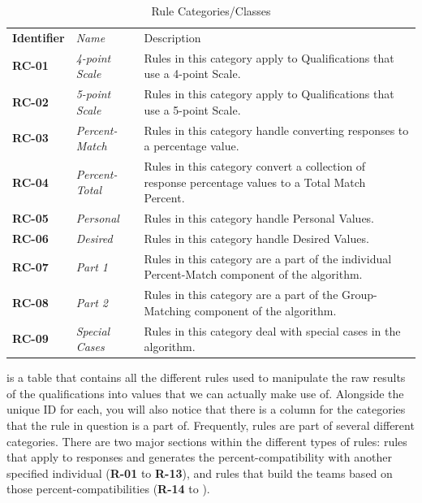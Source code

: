 \documentclass[12pt,letterpaper]{article}
\begin{document}
\begin{table}[H]
	\caption{Rule Categories/Classes}
	\begin{tabu} to 
	    \tableheader{}Identifier & Name & Description\\
		RC-01 & 4-point Scale & Rules in this category apply to Qualifications that use a 4-point Scale.\\
		RC-02 & 5-point Scale & Rules in this category apply to Qualifications that use a 5-point Scale.\\
		RC-03 & Percent-Match & Rules in this category handle converting responses to a percentage value.\\
		RC-04 & Percent-Total & Rules in this category convert a collection of response percentage values to a Total Match Percent.\\
		RC-05 & Personal & Rules in this category handle Personal Values. \\
		RC-06 & Desired & Rules in this category handle Desired Values.\\
		RC-07 & Part 1 & Rules in this category are a part of the individual Percent-Match component of the algorithm.\\
		RC-08 & Part 2 & Rules in this category are a part of the Group-Matching component of the algorithm.\\
		RC-09 & Special Cases & Rules in this category deal with special cases in the algorithm.\\
	\end{tabu}
\end{table}

 is a table that contains all the different rules used to manipulate the raw results of the qualifications into values that we can actually make use of. Alongside the unique ID for each, you will also notice that there is a column for the categories that the rule in question is a part of. Frequently, rules are part of several different categories. There are two major sections within the different types of rules: rules that apply to responses and generates the percent-compatibility with another specified individual ({\bf R-01} to {\bf R-13}), and rules that build the teams based on those percent-compatibilities ({\bf R-14} to {\bf }).
\end{document}
